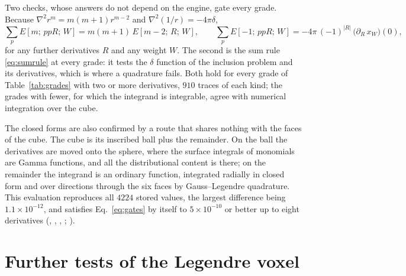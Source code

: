 \documentclass[preprint,review,12pt]{elsarticle}
\begin{document}
Two checks, whose answers do not depend on the engine, gate every grade. Because
$\nabla^2r^m=m(m+1)r^{m-2}$ and $\nabla^2(1/r)=-4\pi\delta$,
\begin{equation}\label{eq:gates}
  \sum_pE[m;\,ppR;\,W]=m(m+1)\,E[m-2;\,R;\,W],\qquad
  \sum_pE[-1;\,ppR;\,W]=-4\pi\,(-1)^{|R|}\,\bigl(\partial_R\,x_W\bigr)(0),
\end{equation}
for any further derivatives $R$ and any weight $W$. The second is the sum rule \eqref{eq:sumrule} at
every grade: it tests the $\delta$ function of the inclusion problem and its derivatives, which is
where a quadrature fails. Both hold for every grade of Table~\ref{tab:grades} with two or more
derivatives, $910$ traces of each kind; the grades with fewer, for which the integrand is integrable,
agree with numerical integration over the cube.

The closed forms are also confirmed by a route that shares nothing with the faces of the cube. The
cube is its inscribed ball plus the remainder. On the ball the derivatives are moved onto the sphere,
where the surface integrals of monomials are Gamma functions, and all the distributional content is
there; on the remainder the integrand is an ordinary function, integrated radially in closed form and
over directions through the six faces by Gauss--Legendre quadrature. This evaluation reproduces all
$4224$ stored values, the largest difference being $1.1\times10^{-12}$, and satisfies
Eq.~\eqref{eq:gates} by itself to $5\times10^{-10}$ or better up to eight derivatives
(, , ,
; ).

\FloatBarrier

\section{Further tests of the Legendre voxel}\label{app:legendre}
\end{document}
